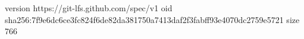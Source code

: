 version https://git-lfs.github.com/spec/v1
oid sha256:7f9e6dc6ce3fc824f6de82da381750a7413daf2f3fabff93e4070dc2759e5721
size 766
